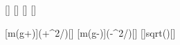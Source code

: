 [\mpss]
[\kilo\gram]
[\mps]
[\meter]

[m\left(g+\right)]{\mSbX*(\gEX+\vSbX^2/\rSbX)}[\newton]
[m\left(g-\right)]{\mSbX*(\gEX-\vSbX^2/\rSbX)}[\newton]
[]{sqrt(\gEX*\rSbX)}[\mps]
